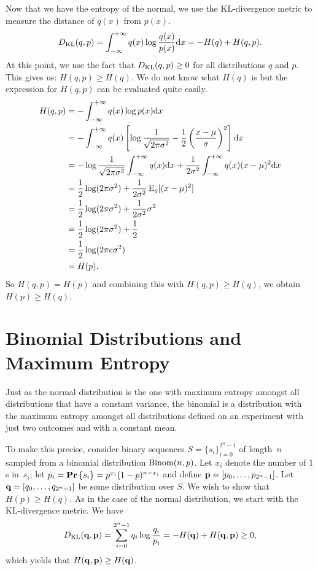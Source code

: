 Now that we have the entropy of the normal, we use the KL-divergence metric
to measure the distance of $q(x)$ from $p(x)$.
\begin{align*}
    D_{\text{KL}} (q, p) = \int_{- \infty}^{+ \infty} q(x) \log \frac{q(x)}{p(x)} \mathrm{d} x = - H(q) + H(q, p).
\end{align*}
At this point, we use the fact that $D_{\text{KL}} (q, p) \geq 0$ for all distributions $q$ and $p$.
This gives us: $H(q, p) \geq H(q)$. We do not know what $H(q)$ is but the expression
for $H(q, p)$ can be evaluated quite easily.
\begin{align*}
    H(q, p) & = - \int_{- \infty}^{+ \infty} q(x) \log p(x) \mathrm{d} x \\
            & =  - \int_{- \infty}^{+ \infty} q(x)
                \left [ \log \frac{1}{\sqrt{2 \pi \sigma^2}}
                - \frac{1}{2} \left ( \frac{x - \mu}{\sigma} \right )^2 \right ] \mathrm{d} x \\
            & = - \log \frac{1}{\sqrt{2 \pi \sigma^2}}  \int_{- \infty}^{+ \infty} q(x) \mathrm{d} x +
                \frac{1}{2 \sigma^2} \int_{- \infty}^{+ \infty} q(x) ( x - \mu )^2 \mathrm{d} x\\
            & = \frac{1}{2} \log (2 \pi \sigma^2) + \frac{1}{2 \sigma^2} \operatorname{E}_{q} [(x - \mu)^2] \\
            & = \frac{1}{2} \log (2 \pi \sigma^2) + \frac{1}{2 \sigma^2} \sigma^2 \\
            & = \frac{1}{2} \log (2 \pi \sigma^2) + \frac{1}{2} \\
            & = \frac{1}{2} \log (2 \pi e \sigma^2) \\
            & = H(p).
\end{align*}
So $H(q, p) = H(p)$ and combining this with $H(q, p) \geq H(q)$, we
obtain $H(p) \geq H(q)$.

\section{Binomial Distributions and Maximum Entropy}

Just as the normal distribution is the one with maximum entropy amongst all distributions that have
a constant variance, the binomial is a distribution with the maximum entropy amongst
all distributions defined on an experiment with just two outcomes and with a constant mean.

To make this precise, consider binary sequences $S = \{ s_i \}_{i = 0}^{2^n - 1}$
of length~$n$ sampled from a binomial distribution $\mathrm{Binom}(n, p)$. Let $x_i$ denote
the number of $1$s in~$s_i$; let $p_i = \mathbf{Pr} \left \{ s_i \right \} = p^{x_i} (1 - p)^{n - x_i}$ and define
$\mathbf{p} = [p_0, \ldots, p_{2^n - 1}]$. Let $\mathbf{q} = [q_0, \ldots, q_{2^n - 1}]$ be some
distribution over $S$. We wish to show that $H(p) \geq H(q)$. As in the case of the
normal distribution, we start with the KL-divergence metric. We have
\[
    D_{\text{KL}} (\mathbf{q}, \mathbf{p}) = \sum_{i = 0}^{2^n - 1} q_i \log \frac{q_i}{p_i}
        = - H(\mathbf{q}) + H(\mathbf{q}, \mathbf{p}) \geq 0,
\]
which yields that $H(\mathbf{q}, \mathbf{p}) \geq H(\mathbf{q})$.

